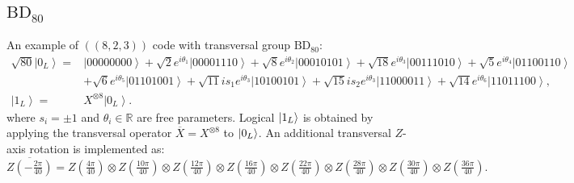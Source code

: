 \documentclass[8pt]{article}
\theoremstyle{definition}
\begin{document}
\subsection{\texorpdfstring{$\mathrm{BD}_{80}$}{BD₈₀}}

An example of $((8,2,3))$ code with transversal group $\mathrm{BD}_{80}$:
\begin{align*}
    \sqrt{80}\left|0_{L}\right\rangle = & \left|00000000\right\rangle +\sqrt{2}e^{i\theta_{1}}\left|00001110\right\rangle +\sqrt{8}e^{i\theta_{2}}\left|00010101\right\rangle +\sqrt{18}e^{i\theta_{3}}\left|00111010\right\rangle +\sqrt{5}e^{i\theta_{4}}\left|01100110\right\rangle \\&+\sqrt{6}e^{i\theta_{5}}\left|01101001\right\rangle +\sqrt{11}is_{1}e^{i\theta_{3}}\left|10100101\right\rangle +\sqrt{15}is_{2}e^{i\theta_{3}}\left|11000011\right\rangle +\sqrt{14}e^{i\theta_{6}}\left|11011100\right\rangle ,\\
    \left|1_{L}\right\rangle =          & X^{\otimes8}\left|0_{L}\right\rangle.
\end{align*}
where \(s_i = \pm 1\) and \(\theta_i \in \mathbb{R}\) are free parameters. Logical \(\ket{1_L}\) is obtained by applying the transversal operator \(\overline{X} = X^{\otimes 8}\) to \(\ket{0_L}\). An additional transversal \(Z\)-axis rotation is implemented as:
\[ \overline{Z\left(-\tfrac{2\pi}{40}\right)}=Z\left(\tfrac{4\pi}{40}\right)\otimes Z\left(\tfrac{10\pi}{40}\right)\otimes Z\left(\tfrac{12\pi}{40}\right)\otimes Z\left(\tfrac{16\pi}{40}\right)\otimes Z\left(\tfrac{22\pi}{40}\right)\otimes Z\left(\tfrac{28\pi}{40}\right)\otimes Z\left(\tfrac{30\pi}{40}\right)\otimes Z\left(\tfrac{36\pi}{40}\right).\]



\end{document}
